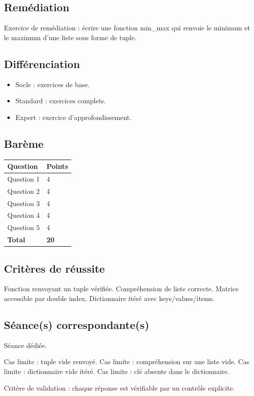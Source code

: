 \subsection{Remédiation}

Exercice de remédiation : écrire une fonction min\_max qui renvoie le
minimum et le maximum d'une liste sous forme de tuple.

\subsection{Différenciation}

\begin{itemize}
\tightlist
\item
  Socle : exercices de base.
\item
  Standard : exercices complets.
\item
  Expert : exercice d'approfondissement.
\end{itemize}

\subsection{Barème}

\begin{longtable}[]{@{}ll@{}}
\toprule\noalign{}
Question & Points \\
\midrule\noalign{}
\endhead
\bottomrule\noalign{}
\endlastfoot
Question 1 & 4 \\
Question 2 & 4 \\
Question 3 & 4 \\
Question 4 & 4 \\
Question 5 & 4 \\
\textbf{Total} & \textbf{20} \\
\end{longtable}

\subsection{Critères de réussite}

Fonction renvoyant un tuple vérifiée. Compréhension de liste correcte.
Matrice accessible par double index. Dictionnaire itéré avec
keys/values/items.

\subsection{Séance(s) correspondante(s)}

Séance dédiée.

Cas limite : tuple vide renvoyé. Cas limite : compréhension sur une
liste vide. Cas limite : dictionnaire vide itéré. Cas limite : clé
absente dans le dictionnaire.

Critère de validation : chaque réponse est vérifiable par un contrôle
explicite.
